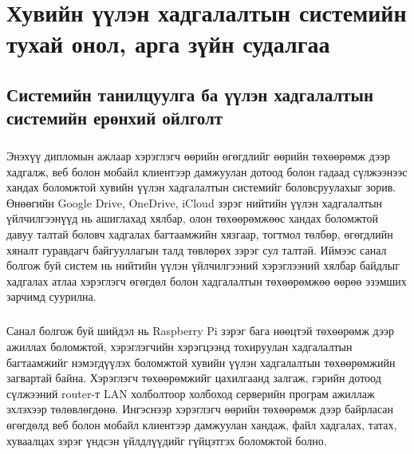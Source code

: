 
\chapter{Хувийн үүлэн хадгалалтын системийн тухай онол, арга зүйн судалгаа} %
\label{Chapter1} %


\newcommand{\keyword}[1]{\textbf{#1}}
\newcommand{\tabhead}[1]{\textbf{#1}}
\newcommand{\code}[1]{\texttt{#1}}
\newcommand{\file}[1]{\texttt{\bfseries#1}}
\newcommand{\option}[1]{\texttt{\itshape#1}}


\section{Системийн танилцуулга ба үүлэн хадгалалтын системийн ерөнхий ойлголт}

\paragraph{}
Энэхүү дипломын ажлаар хэрэглэгч өөрийн өгөгдлийг өөрийн төхөөрөмж дээр хадгалж, веб болон мобайл клиентээр дамжуулан дотоод болон гадаад сүлжээнээс хандах боломжтой хувийн үүлэн хадгалалтын системийг боловсруулахыг зорив. Өнөөгийн Google Drive, OneDrive, iCloud зэрэг нийтийн үүлэн хадгалалтын үйлчилгээнүүд нь ашиглахад хялбар, олон төхөөрөмжөөс хандах боломжтой давуу талтай боловч хадгалах багтаамжийн хязгаар, тогтмол төлбөр, өгөгдлийн хяналт гуравдагч байгууллагын талд төвлөрөх зэрэг сул талтай. Иймээс санал болгож буй систем нь нийтийн үүлэн үйлчилгээний хэрэглээний хялбар байдлыг хадгалах атлаа хэрэглэгч өгөгдөл болон хадгалалтын төхөөрөмжөө өөрөө эзэмших зарчимд суурилна.

\paragraph{}
Санал болгож буй шийдэл нь Raspberry Pi зэрэг бага нөөцтэй төхөөрөмж дээр ажиллах боломжтой, хэрэглэгчийн хэрэгцээнд тохируулан хадгалалтын багтаамжийг нэмэгдүүлэх боломжтой хувийн үүлэн хадгалалтын төхөөрөмжийн загвартай байна. Хэрэглэгч төхөөрөмжийг цахилгаанд залгаж, гэрийн дотоод сүлжээний router-т LAN холболтоор холбоход серверийн програм ажиллаж эхлэхээр төлөвлөгдөнө. Ингэснээр хэрэглэгч өөрийн төхөөрөмж дээр байрласан өгөгдөлд веб болон мобайл клиентээр дамжуулан хандаж, файл хадгалах, татах, хуваалцах зэрэг үндсэн үйлдлүүдийг гүйцэтгэх боломжтой болно.


